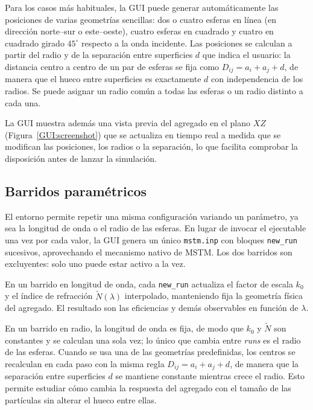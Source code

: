 Para los casos más habituales, la GUI puede generar automáticamente las
posiciones de varias geometrías sencillas: dos o cuatro esferas en línea
(en dirección norte--sur o este--oeste), cuatro esferas en cuadrado y
cuatro en cuadrado girado $45^\circ$ respecto a la onda incidente. Las
posiciones se calculan a partir del radio y de la separación entre
superficies $d$ que indica el usuario: la distancia centro a centro de un
par de esferas se fija como $D_{ij} = a_i + a_j + d$, de manera que el hueco
entre superficies es exactamente $d$ con independencia de los radios. Se
puede asignar un radio común a todas las esferas o un radio distinto a
cada una.

La GUI muestra además una vista previa del agregado en el plano $XZ$
(Figura~\ref{GUI:screenshot}) que se actualiza en tiempo real a medida
que se modifican las posiciones, los radios o la separación, lo que
facilita comprobar la disposición antes de lanzar la simulación.

\subsection{Barridos paramétricos}
\label{subsec:sweeps}

El entorno permite repetir una misma configuración variando un
parámetro, ya sea la longitud de onda o el radio de las esferas. En lugar
de invocar el ejecutable una vez por cada valor, la GUI genera un único
\texttt{mstm.inp} con bloques \texttt{new\_run} sucesivos, aprovechando el
mecanismo nativo de MSTM. Los dos barridos son excluyentes: solo uno puede
estar activo a la vez.

En un barrido en longitud de onda, cada \texttt{new\_run} actualiza el
factor de escala $k_{0}$ y el índice de refracción
$\tilde{N}(\lambda)$ interpolado, manteniendo fija la geometría física del
agregado. El resultado son las eficiencias y demás observables en función
de $\lambda$.

En un barrido en radio, la longitud de onda es fija, de modo que $k_{0}$
y $\tilde{N}$ son constantes y se calculan una sola vez; lo único que
cambia entre \emph{runs} es el radio de las esferas. Cuando se usa una de
las geometrías predefinidas, los centros se recalculan en cada paso con la
misma regla $D_{ij} = a_i + a_j + d$, de manera que la separación entre superficies
$d$ se mantiene constante mientras crece el radio. Esto permite estudiar
cómo cambia la respuesta del agregado con el tamaño de las partículas sin
alterar el hueco entre ellas.

